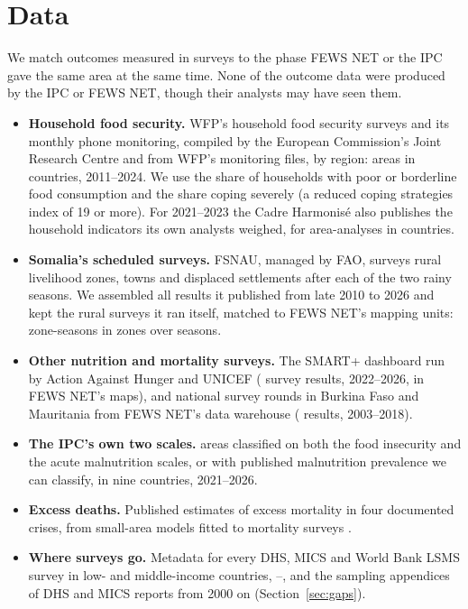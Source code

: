 \documentclass[11pt]{article}
\begin{document}
\section{Data}\label{sec:data}

We match outcomes measured in surveys to the phase FEWS NET or the IPC gave the same area at the same time. None of the outcome data were produced by the IPC or FEWS NET, though their analysts may have seen them.
\begin{itemize}
  \item \textbf{Household food security.} WFP's household food security surveys and its monthly phone monitoring, compiled by the European Commission's Joint Research Centre \citep{machefer2025hfid} and from WFP's monitoring files, by region: \fsFoodAreas{} areas in \fsFoodCountries{} countries, 2011--2024. We use the share of households with poor or borderline food consumption and the share coping severely (a reduced coping strategies index of 19 or more). For 2021--2023 the Cadre Harmonis\'e also publishes the household indicators its own analysts weighed, for \chN{} area-analyses in \chCountries{} countries.
  \item \textbf{Somalia's scheduled surveys.} FSNAU, managed by FAO, surveys rural livelihood zones, towns and displaced settlements after each of the two rainy seasons. We assembled all \fsAll{} results it published from late 2010 to 2026 and kept the rural surveys it ran itself, matched to FEWS NET's mapping units: \fsN{} zone-seasons in \fsZones{} zones over \fsSeasons{} seasons.
  \item \textbf{Other nutrition and mortality surveys.} The SMART+ dashboard run by Action Against Hunger and UNICEF (\spN{} survey results, 2022--2026, \spNfews{} in FEWS NET's maps), and national survey rounds in Burkina Faso and Mauritania from FEWS NET's data warehouse (\fdwN{} results, 2003--2018).
  \item \textbf{The IPC's own two scales.} \amnAnyN{} areas classified on both the food insecurity and the acute malnutrition scales, or with published malnutrition prevalence we can classify, in nine countries, 2021--2026.
  \item \textbf{Excess deaths.} Published estimates of excess mortality in four documented crises, from small-area models fitted to mortality surveys \citep{checchi2013,warsame2023,lshtm2023somalia,checchi2023nigeria}.
  \item \textbf{Where surveys go.} Metadata for every DHS, MICS and World Bank LSMS survey in \gapCountries{} low- and middle-income countries, \gapYearZero{}--\gapYearOne{}, and the sampling appendices of \exReports{} DHS and MICS reports from 2000 on (Section~\ref{sec:gaps}).
\end{itemize}
\end{document}
